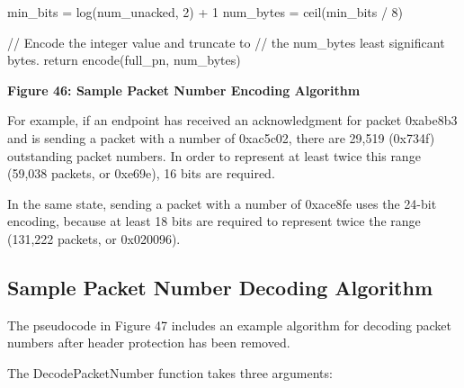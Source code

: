 \documentclass{article}
\begin{document}
min\_bits = log(num\_unacked, 2) + 1 num\_bytes = ceil(min\_bits / 8)

// Encode the integer value and truncate to // the num\_bytes least significant bytes. return encode(full\_pn, num\_bytes)

\begin{center}
\textbf{Figure 46: Sample Packet Number Encoding Algorithm}
\end{center}

For example, if an endpoint has received an acknowledgment for packet 0xabe8b3 and is sending a packet with a number of 0xac5c02, there are 29,519 (0x734f) outstanding packet numbers.  In order to represent at least twice this range (59,038 packets, or 0xe69e), 16 bits are required.

In the same state, sending a packet with a number of 0xace8fe uses the 24-bit encoding, because at least 18 bits are required to represent twice the range (131,222 packets, or 0x020096).

\subsection{Sample Packet Number Decoding Algorithm}

The pseudocode in Figure 47 includes an example algorithm for decoding packet numbers after header protection has been removed.

The DecodePacketNumber function takes three arguments:
\end{document}

